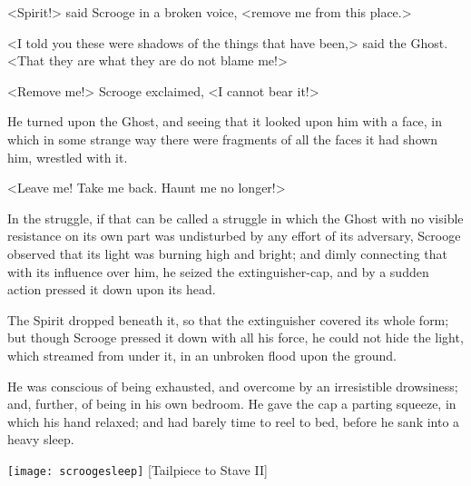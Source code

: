<Spirit!> said Scrooge in a broken voice, <remove me from this place.>

<I told you these were shadows of the things that have been,> said the Ghost. <That they are what they are do not blame me!>

<Remove me!> Scrooge exclaimed, <I cannot bear it!>

He turned upon the Ghost, and seeing that it looked upon him with a face, in which in some strange way there were fragments of all the faces it had shown him, wrestled with it.

<Leave me! Take me back. Haunt me no longer!>

In the struggle, if that can be called a struggle in which the Ghost with no visible resistance on its own part was undisturbed by any effort of its adversary, Scrooge observed that its light was burning high and bright; and dimly connecting that with its influence over him, he seized the extinguisher-cap, and by a sudden action pressed it down upon its head.

The Spirit dropped beneath it, so that the extinguisher covered its whole form; but though Scrooge pressed it down with all his force, he could not hide the light, which streamed from under it, in an unbroken flood upon the ground.

He was conscious of being exhausted, and overcome by an irresistible drowsiness; and, further, of being in his own bedroom. He gave the cap a parting squeeze, in which his hand relaxed; and had barely time to reel to bed, before he sank into a heavy sleep.
\nopagebreak[4]
\vfill
\begin{center}
\texttt{[image: scroogesleep]}
[Tailpiece to Stave II]{}
\end{center}